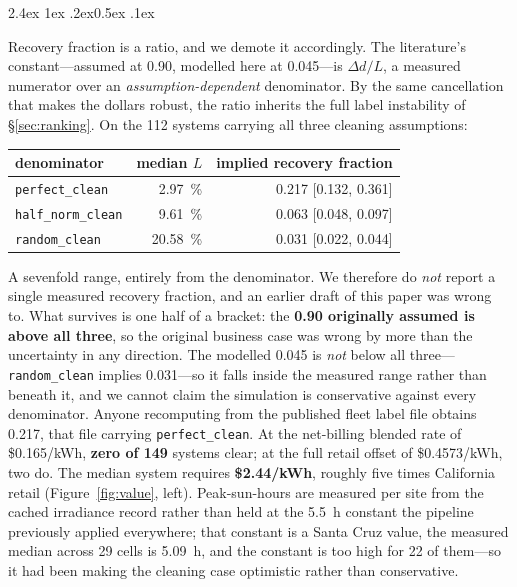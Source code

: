 \documentclass[10pt,twocolumn]{article}
\makeatletter
\renewcommand\paragraph{\@startsection{paragraph}{4}{\z@}%
  {2.4ex \@plus1ex \@minus.2ex}{0.5ex \@plus .1ex}%
  {\normalfont\normalsize\bfseries\raggedright}}
\makeatother
\begin{document}
\paragraph{Recovery fraction is a ratio, and we demote it accordingly.}
The literature's constant---assumed at 0.90, modelled here at 0.045---is
$\Delta d / L$, a measured numerator over an \emph{assumption-dependent} denominator. By
the same cancellation that makes the dollars robust, the ratio inherits the full label
instability of \S\ref{sec:ranking}. On the 112 systems carrying all three cleaning
assumptions:

\begin{center}\small
\begin{tabular}{@{}lrr@{}}
\toprule
denominator & median $L$ & implied recovery fraction \\
\midrule
\texttt{perfect\_clean}    & \SI{2.97}{\percent}  & 0.217 [0.132, 0.361] \\
\texttt{half\_norm\_clean} & \SI{9.61}{\percent}  & 0.063 [0.048, 0.097] \\
\texttt{random\_clean}     & \SI{20.58}{\percent} & 0.031 [0.022, 0.044] \\
\bottomrule
\end{tabular}
\end{center}

\noindent
A sevenfold range, entirely from the denominator. We therefore do \emph{not} report a
single measured recovery fraction, and an earlier draft of this paper was wrong to. What
survives is one half of a bracket: the \textbf{0.90 originally assumed is above all three},
so the original business case was wrong by more than the uncertainty in any direction. The
modelled 0.045 is \emph{not} below all three---\texttt{random\_clean} implies 0.031---so it
falls inside the measured range rather than beneath it, and we cannot claim the simulation
is conservative against every denominator. Anyone recomputing from the published fleet label file obtains 0.217, that
file carrying \texttt{perfect\_clean}.
At the net-billing blended rate of \$0.165/kWh, \textbf{zero of 149} systems clear; at the
full retail offset of \$0.4573/kWh, two do. The median system requires
\textbf{\$2.44/kWh}, roughly five times California retail (Figure~\ref{fig:value}, left).
Peak-sun-hours are measured per site from the cached irradiance record rather than held at
the \SI{5.5}{\hour} constant the pipeline previously applied everywhere; that constant is a
Santa Cruz value, the measured median across 29 cells is \SI{5.09}{\hour}, and the constant
is too high for 22 of them---so it had been making the cleaning case optimistic rather than
conservative.
\end{document}
